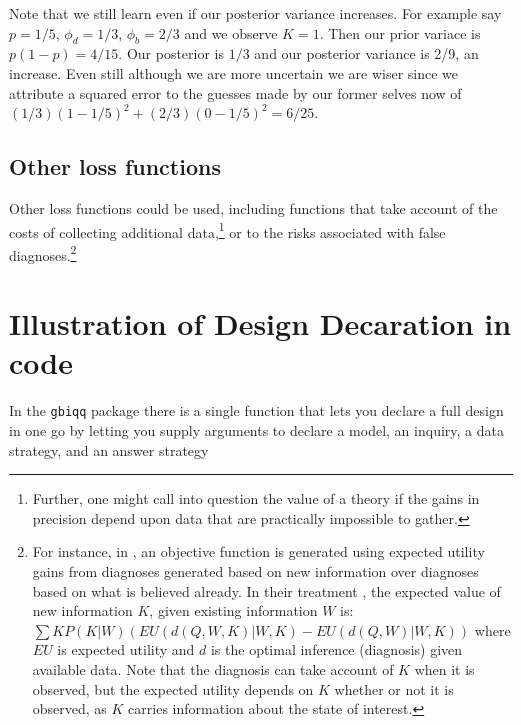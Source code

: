 \documentclass[12pt,]{book}
\let\rmarkdownfootnote\footnote%
\def\footnote{\protect\rmarkdownfootnote}
\begin{document}
Note that we still learn even if our posterior variance increases. For example say \(p = 1/5\), \(\phi_d = 1/3\), \(\phi_b = 2/3\) and we observe \(K=1\). Then our prior variace is \(p(1-p) = 4/15\). Our posterior is \(1/3\) and our posterior variance is 2/9, an increase. Even still although we are more uncertain we are wiser since we attribute a squared error to the guesses made by our former selves now of \((1/3)(1-1/5)^2 + (2/3)(0 - 1/5)^2 = 6/25\).

\hypertarget{other-loss-functions}{%
\subsection{Other loss functions}\label{other-loss-functions}}

Other loss functions could be used, including functions that take account of the costs of collecting additional data,\footnote{Further, one might call into question the value of a theory if the gains in precision depend upon data that are practically impossible to gather.} or to the risks associated with false diagnoses.\footnote{For instance, in \citet{heckerman1991toward}, an objective function is generated using expected utility gains from diagnoses generated based on new information over diagnoses based on what is believed already. In their treatment \citep[Equation 6]{heckerman1991toward}, the expected value of new information \(K\), given existing information \(W\) is: \(\sum{K}P(K|W)( EU(d(Q,W,K)|W, K) - EU(d(Q, W)|W, K))\) where \(EU\) is expected utility and \(d\) is the optimal inference (diagnosis) given available data. Note that the diagnosis can take account of \(K\) when it is observed, but the expected utility depends on \(K\) whether or not it is observed, as \(K\) carries information about the state of interest.}

\hypertarget{illustration-of-design-decaration-in-code}{%
\section{Illustration of Design Decaration in code}\label{illustration-of-design-decaration-in-code}}

In the \texttt{gbiqq} package there is a single function that lets you declare a full design in one go by letting you supply arguments to declare a model, an inquiry, a data strategy, and an answer strategy
\end{document}

